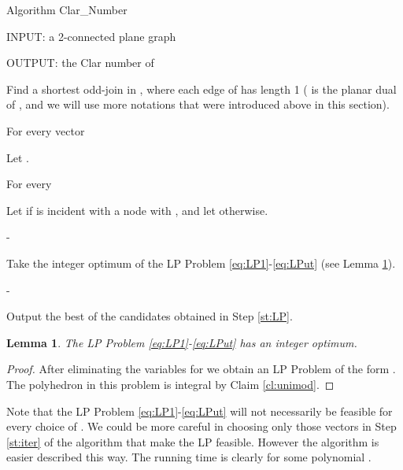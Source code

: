 \documentclass{article}
\makeatletter
\newcounter{Kulso}
\newenvironment{pszkod}[2][1]
{
  \setcounter{Kulso}{#1}
\sffamily
  \vspace{\topsep}              \noindent
{#2}
  \begin{list}{\rmfamily\arabic{Kulso}.\@arabic\c@enumiv.}
    {\usecounter{enumiv}\renewcommand\p@enumiv{\arabic{Kulso}.}
     \renewcommand\theenumiv{\@arabic\c@enumiv}
     \setlength{\parsep}{0pt}
     \setlength{\itemsep}{0pt}
     \setlength{\topsep}{0pt}
    }
  \psz@cimke{begin}
}
{
  \psz@cimke{end}
  \end{list}
  \vspace{\topsep}
}
\newlength{\tabhossz}
\newcommand{\untab}{\par \advance\@totalleftmargin -\tabhossz   \advance\linewidth \tabhossz
\parshape \@ne \@totalleftmargin \linewidth
\addtolength{\labelsep}{-\tabhossz}}
\newcommand{\psz@cimke}[1]{\item[{\makebox[\labelwidth][l]{#1}}]}
\newtheorem{lemma}{Lemma}
\makeatother
\begin{document}
\begin{pszkod}{Algorithm Clar\_Number}

\item[] INPUT: a 2-connected plane graph 

\item[] OUTPUT: the Clar number of 

\item Find a shortest odd-join in ,
where each edge of  has length 1
( is the planar dual of , and we will use more  notations that were introduced above in this section).







\item For every vector  \label{st:iter}

\tab

  \item Let . 

  \item For every 
    \tab

      \item Let   if  is incident with a node  with , and let  otherwise.

    \untab

  \item \label{st:LP} Take the integer optimum of the LP Problem
    \eqref{eq:LP1}-\eqref{eq:LPut} (see Lemma \ref{lem:intpoly}).
  

\untab

\item Output the best of the candidates obtained in Step \ref{st:LP}.

\end{pszkod}

\begin{lemma}\label{lem:intpoly}
The LP Problem \eqref{eq:LP1}-\eqref{eq:LPut} has an integer optimum.
\end{lemma}
\begin{proof}
After eliminating the variables  for  we obtain an LP
Problem of the form . The polyhedron in this problem is
integral by Claim \ref{cl:unimod}.
\end{proof}

Note that the  LP Problem \eqref{eq:LP1}-\eqref{eq:LPut} will not necessarily be feasible for every choice of . We could be more careful in choosing only those vectors in Step \ref{st:iter} of the algorithm that make the LP feasible. However the algorithm is easier described this way. The running time is clearly  for some polynomial .
\end{document}
